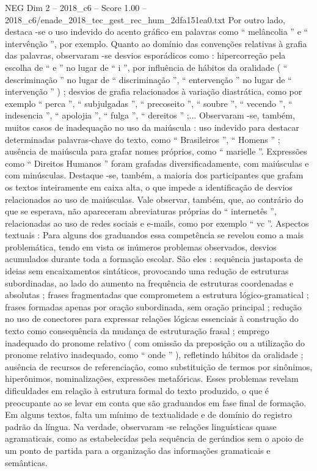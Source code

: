 \begin{textsample}{NEG Dim 2 – 2018\_c6 – Score 1.00 – 2018\_c6/enade\_2018\_tec\_gest\_rec\_hum\_2dfa151ea0.txt}
Por outro lado, destaca -se o uso indevido do acento gráfico em palavras como “ melâncolia ” e “ intervênção ”, por exemplo.
Quanto ao domínio das convenções relativas à grafia das palavras, observaram -se desvios esporádicos como : hipercorreção pela escolha de “ e ” no lugar de “ i ”, por influência de hábitos da oralidade ( “ descriminação ” no lugar de “ discriminação ”, “ entervenção ” no lugar de “ intervenção ” ) ; desvios de grafia relacionados à variação diastrática, como por exemplo “ perca ”, “ subjulgadas ”, “ precoseito ”, “ soubre ”, “ vecendo ”, “ indesencia ”, “ apolojia ”, “ fulga ”, “ dereitos ” ;...
Observaram -se, também, muitos casos de inadequação no uso da maiúscula : uso indevido para destacar determinadas palavras-chave do texto, como “ Brasileiros ”, “ Homens ” ; ausência de maiúscula para grafar nomes próprios, como “ marielle ”.
Expressões como “ Direitos Humanos ” foram grafadas diversificadamente, com maiúsculas e com minúsculas.
Destaque -se, também, a maioria dos participantes que grafam os textos inteiramente em caixa alta, o que impede a identificação de desvios relacionados ao uso de maiúsculas.
Vale observar, também, que, ao contrário do que se esperava, não apareceram abreviaturas próprias do “ internetês ”, relacionadas ao uso de redes sociais e e-mails, como por exemplo “ vc ”.
Aspectos textuais : Para alguns dos graduandos essa competência se revelou como a mais problemática, tendo em vista os inúmeros problemas observados, desvios acumulados durante toda a formação escolar.
São eles : sequência justaposta de ideias sem encaixamentos sintáticos, provocando uma redução de estruturas subordinadas, ao lado do aumento na frequência de estruturas coordenadas e absolutas ; frases fragmentadas que comprometem a estrutura lógico-gramatical ; frases formadas apenas por oração subordinada, sem oração principal ; redução no uso de conectores para expressar relações lógicas essenciais à construção do texto como consequência da mudança de estruturação frasal ; emprego inadequado do pronome relativo ( com omissão da preposição ou a utilização do pronome relativo inadequado, como “ onde ” ), refletindo hábitos da oralidade ; ausência de recursos de referenciação, como substituição de termos por sinônimos, hiperônimos, nominalizações, expressões metafóricas.
Esses problemas revelam dificuldades em relação à estrutura formal do texto produzido, o que é preocupante ao se levar em conta que são graduandos em fase final de formação.
Em alguns textos, falta um mínimo de textualidade e de domínio do registro padrão da língua.
Na verdade, observaram -se relações linguísticas quase agramaticais, como as estabelecidas pela sequência de gerúndios sem o apoio de um ponto de partida para a organização das informações gramaticais e semânticas.

\end{textsample}
